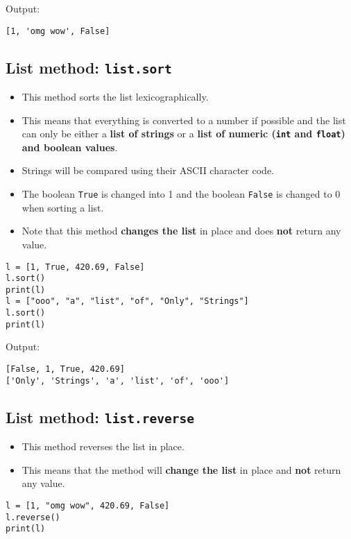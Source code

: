\documentclass[11pt]{article}
\begin{document}
 \noindent Output:

\label{orgcd5b72b}
\begin{verbatim}
[1, 'omg wow', False]
\end{verbatim}
\subsection{List method: \texttt{list.sort}}
\label{sec:orgadbb379}
\begin{itemize}
\item This method sorts the list lexicographically.
\item This means that everything is converted to a number if possible and the list can only be either a \textbf{list of strings} or a \textbf{list of numeric (\texttt{int} and \texttt{float}) and boolean values}.
\item Strings will be compared using their ASCII character code.
\item The boolean \texttt{True} is changed into 1 and the boolean \texttt{False} is changed to 0 when sorting a list.
\item Note that this method \textbf{changes the list} in place and does \textbf{not} return any value.
\end{itemize}

\begin{verbatim}
l = [1, True, 420.69, False]
l.sort()
print(l)
l = ["ooo", "a", "list", "of", "Only", "Strings"]
l.sort()
print(l)
\end{verbatim}

 \noindent Output:

\label{org426b65f}
\begin{verbatim}
[False, 1, True, 420.69]
['Only', 'Strings', 'a', 'list', 'of', 'ooo']
\end{verbatim}
\subsection{List method: \texttt{list.reverse}}
\label{sec:orgc9736a8}
\begin{itemize}
\item This method reverses the list in place.
\item This means that the method will \textbf{change the list} in place and \textbf{not} return any value.
\end{itemize}
\begin{verbatim}
l = [1, "omg wow", 420.69, False]
l.reverse()
print(l)
\end{verbatim}
\end{document}

